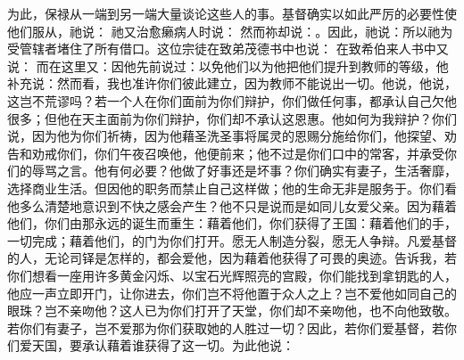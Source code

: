 为此，保禄从一端到另一端大量谈论这些人的事。基督确实以如此严厉的必要性使他们服从，祂说： 祂又治愈癞病人时说： 然而祢却说：。因此，祂说：所以祂为受管辖者堵住了所有借口。这位宗徒在致弟茂德书中也说： 在致希伯来人书中又说： 而在这里又：因他先前说过：以免他们以为他把他们提升到教师的等级，他补充说：然而看，我也准许你们彼此建立，因为教师不能说出一切。他说，他说，这岂不荒谬吗？若一个人在你们面前为你们辩护，你们做任何事，都承认自己欠他很多；但他在天主面前为你们辩护，你们却不承认这恩惠。他如何为我辩护？你们说，因为他为你们祈祷，因为他藉圣洗圣事将属灵的恩赐分施给你们，他探望、劝告和劝戒你们，你们午夜召唤他，他便前来；他不过是你们口中的常客，并承受你们的辱骂之言。他有何必要？他做了好事还是坏事？你们确实有妻子，生活奢靡，选择商业生活。但因他的职务而禁止自己这样做；他的生命无非是服务于。你们看他多么清楚地意识到不快之感会产生？他不只是说而是如同儿女爱父亲。因为藉着他们，你们由那永远的诞生而重生：藉着他们，你们获得了王国：藉着他们的手，一切完成；藉着他们，的门为你们打开。愿无人制造分裂，愿无人争辩。凡爱基督的人，无论司铎是怎样的，都会爱他，因为藉着他获得了可畏的奥迹。告诉我，若你们想看一座用许多黄金闪烁、以宝石光辉照亮的宫殿，你们能找到拿钥匙的人，他应一声立即开门，让你进去，你们岂不将他置于众人之上？岂不爱他如同自己的眼珠？岂不亲吻他？这人已为你们打开了天堂，你们却不亲吻他，也不向他致敬。若你们有妻子，岂不爱那为你们获取她的人胜过一切？因此，若你们爱基督，若你们爱天国，要承认藉着谁获得了这一切。为此他说：\par

\par

